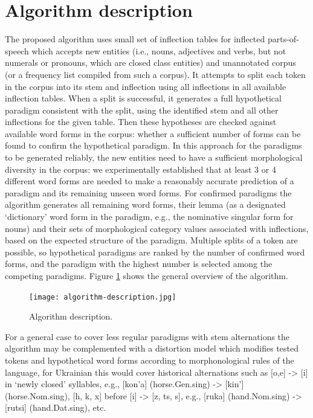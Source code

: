 \documentclass[11pt,a4paper]{article}
\begin{document}
\section{Algorithm description}
\label{sec:Algorithm}

The proposed algorithm uses small set of inflection tables for inflected parts-of-speech which accepts new entities (i.e., nouns, adjectives and verbs, but not numerals or pronouns, which are closed class entities) and unannotated corpus (or a frequency list compiled from such a corpus). It attempts to split each token in the corpus into its stem and inflection using all inflections in all available inflection tables. When a split is successful, it generates a full hypothetical paradigm consistent with the split, using the identified stem and all other inflections for the given table. Then these hypotheses are checked against available word forms in the corpus: whether a sufficient number of forms can be found to confirm the hypothetical paradigm. In this approach for the paradigms to be generated reliably, the new entities need to have a sufficient morphological diversity in the corpus: we experimentally established that at least 3 or 4 different word forms are needed to make a reasonably accurate prediction of a paradigm and its remaining unseen word forms. For confirmed paradigms the algorithm generates all remaining word forms, their lemma (as a designated `dictionary' word form in the paradigm, e.g., the nominative singular form for nouns) and their sets of morphological category values associated with inflections, based on the expected structure of the paradigm. Multiple splits of a token are possible, so hypothetical paradigms are ranked by the number of confirmed word forms, and the paradigm with the highest number is selected among the competing paradigms. Figure \ref{fig:alg1} shows the general overview of the algorithm.

\begin{figure}
	\texttt{[image: algorithm-description.jpg]}
	\caption{Algorithm description.}
	\label{fig:alg1}
\end{figure}

For a general case to cover less regular paradigms with stem alternations the algorithm may be complemented with a distortion model which modifies tested tokens and hypothetical word forms according to morphonological rules of the language, for Ukrainian this would cover historical alternations such as [o,e] -> [i] in `newly closed' syllables, e.g., [kon'a] (horse.Gen.sing) -> [kin'] (horse.Nom.sing), [h, k, x] before [i] -> [z, ts, s], e.g., [ruka] (hand.Nom.sing) -> [rutsi] (hand.Dat.sing), etc.  
\end{document}
